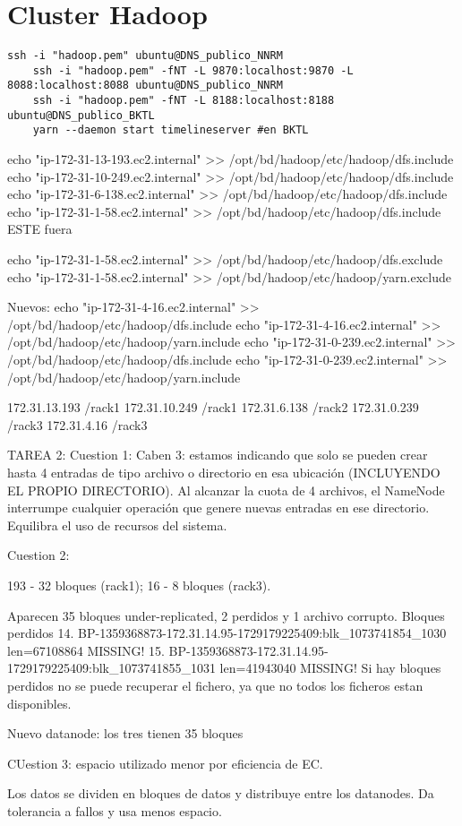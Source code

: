 \chapter{Cluster Hadoop}\label{ChapterCH} 


\begin{lstlisting}[style=terminal]
    ssh -i "hadoop.pem" ubuntu@DNS_publico_NNRM
    ssh -i "hadoop.pem" -fNT -L 9870:localhost:9870 -L 8088:localhost:8088 ubuntu@DNS_publico_NNRM
    ssh -i "hadoop.pem" -fNT -L 8188:localhost:8188 ubuntu@DNS_publico_BKTL
    yarn --daemon start timelineserver #en BKTL
\end{lstlisting}


echo "ip-172-31-13-193.ec2.internal" >> /opt/bd/hadoop/etc/hadoop/dfs.include
echo "ip-172-31-10-249.ec2.internal" >> /opt/bd/hadoop/etc/hadoop/dfs.include
echo "ip-172-31-6-138.ec2.internal" >> /opt/bd/hadoop/etc/hadoop/dfs.include
echo "ip-172-31-1-58.ec2.internal" >> /opt/bd/hadoop/etc/hadoop/dfs.include ESTE fuera

echo "ip-172-31-1-58.ec2.internal" >> /opt/bd/hadoop/etc/hadoop/dfs.exclude
echo "ip-172-31-1-58.ec2.internal" >> /opt/bd/hadoop/etc/hadoop/yarn.exclude


Nuevos:
echo "ip-172-31-4-16.ec2.internal" >> /opt/bd/hadoop/etc/hadoop/dfs.include
echo "ip-172-31-4-16.ec2.internal" >> /opt/bd/hadoop/etc/hadoop/yarn.include
echo "ip-172-31-0-239.ec2.internal" >> /opt/bd/hadoop/etc/hadoop/dfs.include
echo "ip-172-31-0-239.ec2.internal" >> /opt/bd/hadoop/etc/hadoop/yarn.include


172.31.13.193     /rack1
172.31.10.249     /rack1
172.31.6.138     /rack2
172.31.0.239     /rack3
172.31.4.16     /rack3


TAREA 2:
Cuestion 1: Caben 3: estamos indicando que solo se pueden crear hasta 4 entradas de tipo archivo o directorio en esa ubicación (INCLUYENDO EL PROPIO DIRECTORIO). Al alcanzar la cuota de 4 archivos, el NameNode interrumpe cualquier operación que genere nuevas entradas en ese directorio. Equilibra el uso de recursos del sistema.

Cuestion 2: 

193 - 32 bloques (rack1); 16 - 8 bloques (rack3).

Aparecen 35 bloques under-replicated, 2 perdidos y 1 archivo corrupto. Bloques perdidos 
14. BP-1359368873-172.31.14.95-1729179225409:blk_1073741854_1030 len=67108864 MISSING!
15. BP-1359368873-172.31.14.95-1729179225409:blk_1073741855_1031 len=41943040 MISSING!
Si hay bloques perdidos no se puede recuperar el fichero, ya que no todos los ficheros estan disponibles.


Nuevo datanode: los tres tienen 35 bloques


CUestion 3:
espacio utilizado menor por eficiencia de EC. 

Los datos se dividen en bloques de datos y distribuye entre los datanodes. Da tolerancia a fallos y usa menos espacio.

